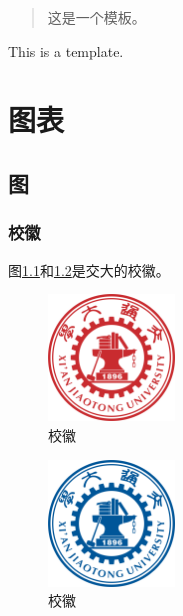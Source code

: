 \documentclass[bachelor]{XJTUthesis}
\begin{document}
\cover


\tableofcontents
\thispagestyle{empty}
\setcounter{page}{0}
\newpage

\begin{abstract}
这是一个模板。
\end{abstract}
\newpage
\begin{eabstract}
This is a template.
\end{eabstract}

\chapter{图表}
\section{图}
\subsection{校徽}
图\ref{xiaohui:red}和\ref{xiaohui:blue}是交大的校徽。
\begin{figure}[htbp]
  \centering
  \includegraphics[width=0.3\textwidth]{figures//a3_1jdxhred.png}
  \caption{校徽}\label{xiaohui:red}
\end{figure}

\begin{figure}[htbp]
  \centering
  \includegraphics[width=0.3\textwidth]{figures//a3_2jdxhblue.png}
  \caption{校徽}\label{xiaohui:blue}
\end{figure}
\end{document}
